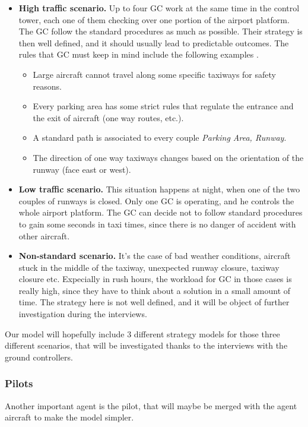 \documentclass{article}
\begin{document}
\begin{itemize}
	\item \textbf{High traffic scenario.} Up to four GC work at the same time in the control tower, each one of them checking over one portion of the airport platform. The GC follow the standard procedures as much as possible. Their strategy is then well defined, and it should usually lead to predictable outcomes. 
	The rules that GC must keep in mind include the following examples \cite{livret}.
	\begin{itemize}
		\item Large aircraft cannot travel along some specific taxiways for safety reasons.
		\item Every parking area has some strict rules that regulate the entrance and the exit of aircraft (one way routes, etc.).
		\item A standard path is associated to every couple \textit{Parking Area, Runway}.
		\item The direction of one way taxiways changes based on the orientation of the runway (face east or west).
	\end{itemize}
	\item \textbf{Low traffic scenario.} This situation happens at night, when one of the two couples of runways is closed. Only one GC is operating, and he controls the whole airport platform. The GC can decide not to follow standard procedures to gain some seconds in taxi times, since there is no danger of accident with other aircraft.
	\item \textbf{Non-standard scenario.} It's the case of bad weather conditions, aircraft stuck in the middle of the taxiway, unexpected runway closure, taxiway closure etc. Expecially in rush hours, the workload for GC in those cases is really high, since they have to think about a solution in a small amount of time. The strategy here is not well defined, and it will be object of further investigation during the interviews.
\end{itemize}

Our model will hopefully include 3 different strategy models for those three different scenarios, that will be investigated thanks to the interviews with the ground controllers.


\subsubsection{Pilots}

Another important agent is the pilot, that will maybe be merged with the agent aircraft to make the model simpler. 
\end{document}
